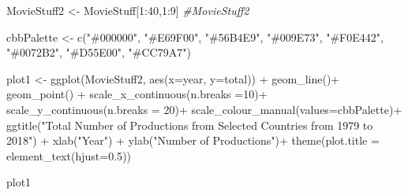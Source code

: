\documentclass[
]{article}
\newenvironment{Shaded}{\begin{snugshade}}{\end{snugshade}}
\newcommand{\AttributeTok}[1]{\textcolor[rgb]{0.77,0.63,0.00}{#1}}
\newcommand{\CommentTok}[1]{\textcolor[rgb]{0.56,0.35,0.01}{\textit{#1}}}
\newcommand{\DecValTok}[1]{\textcolor[rgb]{0.00,0.00,0.81}{#1}}
\newcommand{\FloatTok}[1]{\textcolor[rgb]{0.00,0.00,0.81}{#1}}
\newcommand{\FunctionTok}[1]{\textcolor[rgb]{0.00,0.00,0.00}{#1}}
\newcommand{\NormalTok}[1]{#1}
\newcommand{\OtherTok}[1]{\textcolor[rgb]{0.56,0.35,0.01}{#1}}
\newcommand{\SpecialCharTok}[1]{\textcolor[rgb]{0.00,0.00,0.00}{#1}}
\newcommand{\StringTok}[1]{\textcolor[rgb]{0.31,0.60,0.02}{#1}}
\begin{document}
\begin{Shaded}
\begin{Highlighting}[]
\NormalTok{MovieStuff2 }\OtherTok{\textless{}{-}}\NormalTok{ MovieStuff[}\DecValTok{1}\SpecialCharTok{:}\DecValTok{40}\NormalTok{,}\DecValTok{1}\SpecialCharTok{:}\DecValTok{9}\NormalTok{]}
\CommentTok{\#MovieStuff2}
\end{Highlighting}
\end{Shaded}

\begin{Shaded}
\end{Shaded}

\begin{Shaded}
\begin{Highlighting}[]
\NormalTok{cbbPalette }\OtherTok{\textless{}{-}} \FunctionTok{c}\NormalTok{(}\StringTok{"\#000000"}\NormalTok{, }\StringTok{"\#E69F00"}\NormalTok{, }\StringTok{"\#56B4E9"}\NormalTok{, }\StringTok{"\#009E73"}\NormalTok{, }\StringTok{"\#F0E442"}\NormalTok{, }\StringTok{"\#0072B2"}\NormalTok{, }\StringTok{"\#D55E00"}\NormalTok{, }\StringTok{"\#CC79A7"}\NormalTok{)}
\end{Highlighting}
\end{Shaded}

\begin{Shaded}
\begin{Highlighting}[]
\NormalTok{plot1 }\OtherTok{\textless{}{-}} \FunctionTok{ggplot}\NormalTok{(MovieStuff2, }\FunctionTok{aes}\NormalTok{(}\AttributeTok{x=}\NormalTok{year, }\AttributeTok{y=}\NormalTok{total)) }\SpecialCharTok{+} 
  \FunctionTok{geom\_line}\NormalTok{()}\SpecialCharTok{+}
  \FunctionTok{geom\_point}\NormalTok{() }\SpecialCharTok{+}
\FunctionTok{scale\_x\_continuous}\NormalTok{(}\AttributeTok{n.breaks =}\DecValTok{10}\NormalTok{)}\SpecialCharTok{+}
  \FunctionTok{scale\_y\_continuous}\NormalTok{(}\AttributeTok{n.breaks =} \DecValTok{20}\NormalTok{)}\SpecialCharTok{+}
   \FunctionTok{scale\_colour\_manual}\NormalTok{(}\AttributeTok{values=}\NormalTok{cbbPalette)}\SpecialCharTok{+}
  \FunctionTok{ggtitle}\NormalTok{(}\StringTok{"Total Number of Productions from Selected Countries from 1979 to 2018"}\NormalTok{) }\SpecialCharTok{+}
  \FunctionTok{xlab}\NormalTok{(}\StringTok{"Year"}\NormalTok{) }\SpecialCharTok{+} \FunctionTok{ylab}\NormalTok{(}\StringTok{"Number of Productions"}\NormalTok{)}\SpecialCharTok{+}
  \FunctionTok{theme}\NormalTok{(}\AttributeTok{plot.title =} \FunctionTok{element\_text}\NormalTok{(}\AttributeTok{hjust=}\FloatTok{0.5}\NormalTok{))}
  

\NormalTok{plot1}
\end{Highlighting}
\end{Shaded}
\end{document}
